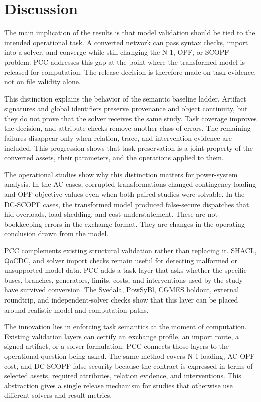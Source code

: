 \documentclass[preprint,12pt]{elsarticle}
\begin{document}
\section{Discussion}
The main implication of the results is that model validation should be tied to the intended operational task. A converted network can pass syntax checks, import into a solver, and converge while still changing the N-1, OPF, or SCOPF problem. PCC addresses this gap at the point where the transformed model is released for computation. The release decision is therefore made on task evidence, not on file validity alone.

This distinction explains the behavior of the semantic baseline ladder. Artifact signatures and global identifiers preserve provenance and object continuity, but they do not prove that the solver receives the same study. Task coverage improves the decision, and attribute checks remove another class of errors. The remaining failures disappear only when relation, trace, and intervention evidence are included. This progression shows that task preservation is a joint property of the converted assets, their parameters, and the operations applied to them.

The operational studies show why this distinction matters for power-system analysis. In the AC cases, corrupted transformations changed contingency loading and OPF objective values even when both paired studies were solvable. In the DC-SCOPF cases, the transformed model produced false-secure dispatches that hid overloads, load shedding, and cost understatement. These are not bookkeeping errors in the exchange format. They are changes in the operating conclusion drawn from the model.

PCC complements existing structural validation rather than replacing it. SHACL, QoCDC, and solver import checks remain useful for detecting malformed or unsupported model data. PCC adds a task layer that asks whether the specific buses, branches, generators, limits, costs, and interventions used by the study have survived conversion. The Svedala, PowSyBl, CGMES holdout, external roundtrip, and independent-solver checks show that this layer can be placed around realistic model and computation paths.

The innovation lies in enforcing task semantics at the moment of computation. Existing validation layers can certify an exchange profile, an import route, a signed artifact, or a solver formulation. PCC connects those layers to the operational question being asked. The same method covers N-1 loading, AC-OPF cost, and DC-SCOPF false security because the contract is expressed in terms of selected assets, required attributes, relation evidence, and interventions. This abstraction gives a single release mechanism for studies that otherwise use different solvers and result metrics.
\end{document}
